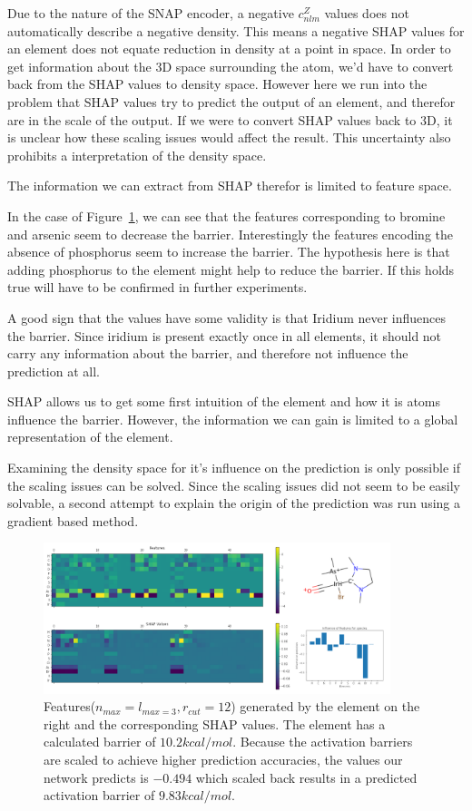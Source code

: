 Due to the nature of the SNAP encoder, a negative $c_{nlm}^Z$ values does not automatically 
describe a negative density.
This means a negative SHAP values for an element does not equate reduction in density
at a point in space.
In order to get information about the 3D space surrounding the atom, we'd have to convert back from 
the SHAP values to density space.
However here we run into the problem that SHAP values try to predict the output
of an element, and therefor are in the scale of the output.
If we were to convert SHAP values back to 3D, it is unclear how these scaling issues would 
affect the result. 
This uncertainty also prohibits a interpretation of the density space.

The information we can extract from SHAP therefor is limited to feature space.

In the case of Figure~\ref{fig:shap}, we can see that the features corresponding to bromine and arsenic seem to decrease the barrier.
Interestingly the features encoding the absence of phosphorus seem to increase the barrier.
The hypothesis here is that adding phosphorus to the element might help to reduce
the barrier.
If this holds true will have to be confirmed in further experiments.

A good sign that the values have some validity is that Iridium never influences the barrier.
Since iridium is present exactly once in all elements, it should not carry any information about the barrier,
and therefore not influence the prediction at all.

SHAP allows us to get some first intuition of the element and how it is atoms influence the barrier.
However, the information we can gain is limited to a global representation of the element.

Examining the density space for it's influence on the prediction is only possible if the scaling
issues can be solved.
Since the scaling issues did not seem to be easily solvable, a second attempt to explain the origin of the prediction
was run using a gradient based method.

\begin{figure}
    \centering
    \includegraphics[width=0.9\textwidth]{figures/evaluation/SHAP.png}
    \caption{
        Features($n_{max}=l_{max=3}, r_{cut}=12$) generated by the element on the right and the corresponding SHAP values.
        The element has a calculated barrier of $10.2 kcal/mol$.
        Because the activation barriers are scaled to achieve higher prediction accuracies,
        the values our network predicts is $-0.494$ which scaled back results in a predicted activation 
        barrier of $9.83 kcal/mol$.
     }
    \label{fig:shap}
  \end{figure}
  

